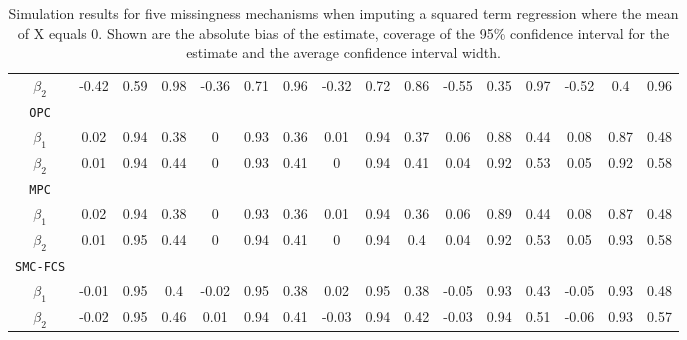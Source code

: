 \begin{table}[ht!]
{\begin{tabular}{c|ccc|ccc|ccc|ccc|ccc}
				$\beta_2$      & -0.42  & 0.59  & 0.98  & -0.36  & 0.71  & 0.96  & -0.32  & 0.72  & 0.86  & -0.55  & 0.35  & 0.97  & -0.52  & 0.4  & 0.96  \\ 
				\texttt{OPC}            &        &        &        &        &        &        &        &        &        &        &        &        &        &        &        \\
				$\beta_1$      & 0.02   & 0.94   & 0.38  & 0  & 0.93  & 0.36  & 0.01  & 0.94  & 0.37  & 0.06  & 0.88  & 0.44  & 0.08  & 0.87  & 0.48  \\
				$\beta_2$      & 0.01  & 0.94  & 0.44  & 0      & 0.93  & 0.41    & 0  & 0.94  & 0.41  & 0.04  & 0.92  & 0.53  & 0.05  & 0.92  & 0.58  \\
				\texttt{MPC}            &        &        &        &        &        &        &        &        &        &        &        &        &        &        &        \\
				$\beta_1$      & 0.02  & 0.94   & 0.38  & 0  & 0.93  & 0.36  & 0.01  & 0.94  & 0.36  & 0.06  & 0.89  & 0.44  & 0.08  & 0.87  & 0.48  \\
				$\beta_2$      & 0.01  & 0.95  & 0.44  & 0  & 0.94  & 0.41  & 0  & 0.94  & 0.4  & 0.04  & 0.92  & 0.53  & 0.05  & 0.93  & 0.58  \\
				\texttt{SMC-FCS}        &        &        &        &        &        &        &        &        &        &        &        &        &        &        &        \\
				$\beta_1$      & -0.01  & 0.95  & 0.4  & -0.02  & 0.95  & 0.38  & 0.02  & 0.95  & 0.38  & -0.05  & 0.93  & 0.43  & -0.05  & 0.93  & 0.48  \\
				$\beta_2$      & -0.02  & 0.95  & 0.46   & 0.01  & 0.94  & 0.41   & -0.03  & 0.94  & 0.42  & -0.03  & 0.94  & 0.51  & -0.06  & 0.93  & 0.57 
			\end{tabular}
		}
		\caption{Simulation results for five missingness mechanisms when imputing a squared term regression where the mean of X equals 0. Shown are the absolute bias of the estimate, coverage of the 95\% confidence interval for the estimate and the average confidence interval width.}
		\label{tab2_3}
	\end{table}
	
